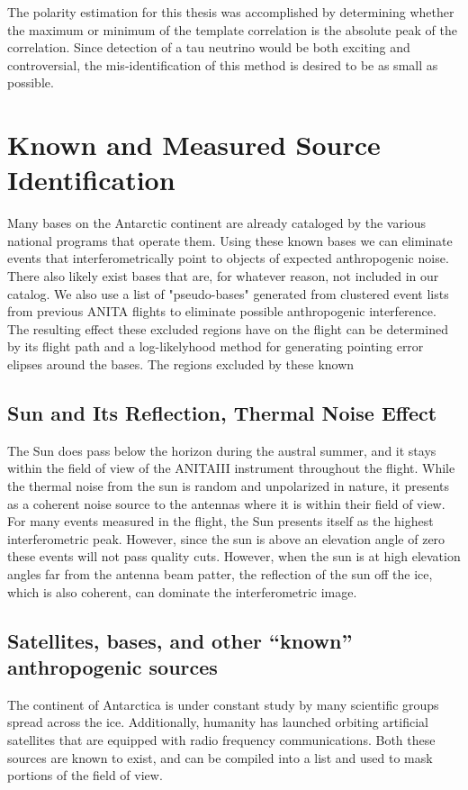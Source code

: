 	The polarity estimation for this thesis was accomplished by determining whether the maximum or minimum of the template correlation is the absolute peak of the correlation.  Since detection of a tau neutrino would be both exciting and controversial, the mis-identification of this method is desired to be as small as possible.

		
\section{Known and Measured Source Identification}
	Many bases on the Antarctic continent are already cataloged by the various national programs that operate them.  Using these known bases we can eliminate events that interferometrically point to objects of expected anthropogenic noise.  There also likely exist bases that are, for whatever reason, not included in our catalog.  We also use a list of "pseudo-bases" generated from clustered event lists from previous ANITA flights to eliminate possible anthropogenic interference.  The resulting effect these excluded regions have on the flight can be determined by its flight path and a log-likelyhood method for generating pointing error elipses around the bases.  The regions excluded by these known 
	
	
	\subsection{Sun and Its Reflection, Thermal Noise Effect}
		The Sun does pass below the horizon during the austral summer, and it stays within the field of view of the ANITAIII instrument throughout the flight.  While the thermal noise from the sun is random and unpolarized in nature, it presents as a coherent noise source to the antennas where it is within their field of view.  For many events measured in the flight, the Sun presents itself as the highest interferometric peak.  However, since the sun is above an elevation angle of zero these events will not pass quality cuts. However, when the sun is at high elevation angles far from the antenna beam patter, the reflection of the sun off the ice, which is also coherent, can dominate the interferometric image.
	
	\subsection{Satellites, bases, and other ``known'' anthropogenic sources}
		The continent of Antarctica is under constant study by many scientific groups spread across the ice.  Additionally, humanity has launched orbiting artificial satellites that are equipped with radio frequency communications.  Both these sources are known to exist, and can be compiled into a list and used to mask portions of the field of view.  

